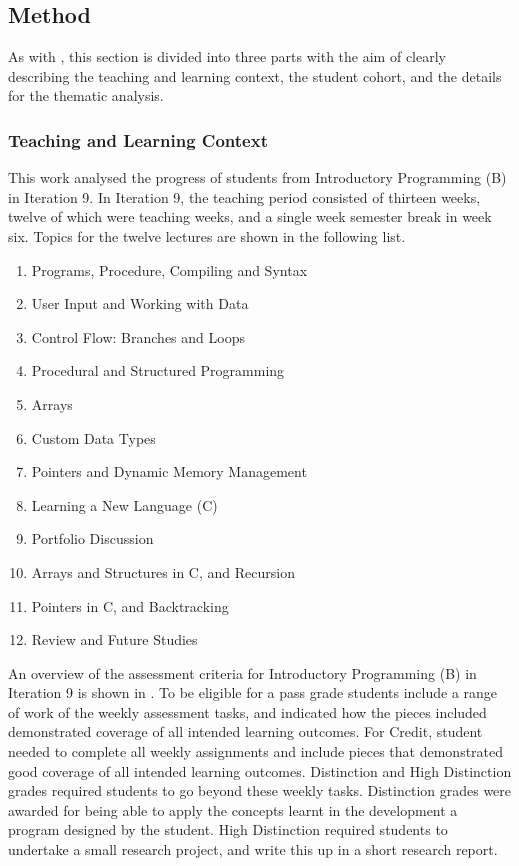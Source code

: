

\subsection{Method} %
\label{sec:progress_method}

As with , this section is divided into three parts with the aim of clearly describing the teaching and learning context, the student cohort, and the details for the thematic analysis.

\subsubsection{Teaching and Learning Context} %
\label{sub:progress_teaching_and_learning_context}

This work analysed the progress of students from Introductory Programming (B) in Iteration 9. In Iteration 9, the teaching period consisted of thirteen weeks, twelve of which were teaching weeks, and a single week semester break in week six. Topics for the twelve lectures are shown in the following list.

\begin{enumerate}
  \item Programs, Procedure, Compiling and Syntax
  \item User Input and Working with Data
  \item Control Flow: Branches and Loops
  \item Procedural and Structured Programming
  \item Arrays
  \item Custom Data Types
  \item Pointers and Dynamic Memory Management
  \item Learning a New Language  (C)
  \item Portfolio Discussion
  \item Arrays and Structures in C, and Recursion
  \item Pointers in C, and Backtracking
  \item Review and Future Studies
\end{enumerate}

An overview of the assessment criteria for Introductory Programming (B) in Iteration 9 is shown in . To be eligible for a pass grade students include a range of work of the weekly assessment tasks, and indicated how the pieces included demonstrated coverage of all intended learning outcomes. For Credit, student needed to complete all weekly assignments and include pieces that demonstrated good coverage of all intended learning outcomes. Distinction and High Distinction grades required students to go beyond these weekly tasks. Distinction grades were awarded for being able to apply the concepts learnt in the development a program designed by the student. High Distinction required students to undertake a small research project, and write this up in a short research report.

